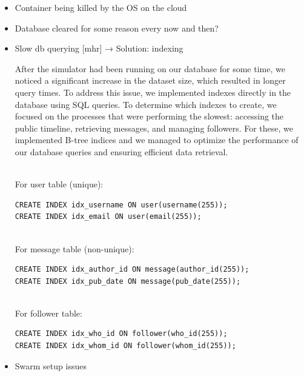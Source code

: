 \documentclass{article}
\begin{document}
\begin{itemize}
    \item Container being killed by the OS on the cloud
    \item Database cleared for some reason every now and then?
  
    \item Slow db querying [mhr]    →      Solution: indexing
    
After the simulator had been running on our database for some time, we noticed a significant increase in the dataset size, which resulted in longer query times. To address this issue, we implemented indexes directly in the database using SQL queries. To determine which indexes to create, we focused on the processes that were performing the slowest: accessing the public timeline, retrieving messages, and managing followers. For these, we implemented B-tree indices and we managed to optimize the performance of our database queries and ensuring efficient data retrieval.

\\For user table (unique):
\begin{verbatim}
CREATE INDEX idx_username ON user(username(255));
CREATE INDEX idx_email ON user(email(255));
\end{verbatim}

\\For message table (non-unique):
\begin{verbatim}
CREATE INDEX idx_author_id ON message(author_id(255));
CREATE INDEX idx_pub_date ON message(pub_date(255));
\end{verbatim}

\\For follower table:
\begin{verbatim}
CREATE INDEX idx_who_id ON follower(who_id(255));
CREATE INDEX idx_whom_id ON follower(whom_id(255));
\end{verbatim}


    \item Swarm setup issues
\end{itemize}
\end{document}
